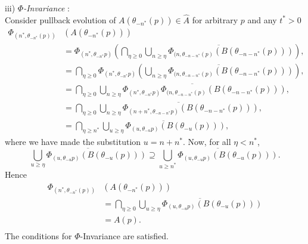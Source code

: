 \begin{prf}
  \hspace*{3mm} iii) {\em $\Phi$-Invariance} : \hfill \\
  Consider pullback evolution of  $A(\theta_{-n^*}(p))
  \in \hat{A}$ for arbitrary $p$ and any $t^* > 0$
    \begin{align*}
  \Phi_{(n^*, \theta_{-n^*}(p))} &(A(\theta_{-n^*}(p))) \\
  &=\Phi_{(n^*, \theta_{-n^*}p)}\left(\bigcap_{\eta \geq 0}
       \overline{ \bigcup_{n
       \geq \eta} \Phi_{(n, \theta_{-n - n^*}(p)} (B(\theta_{-n -
       n^*}(p)))}\right), \\
  &= \bigcap_{\eta \geq 0} \Phi_{(n^*, \theta_{-n^*}p)}\left(
     \overline{\bigcup_{n \geq \eta} \Phi_{(n, \theta_{-n - n^*}(p)}
     (B(\theta_{-n - n^*}(p)))}\right), \\
  &= \bigcap_{\eta \geq 0} \overline{\bigcup_{n \geq \eta} \Phi_{(n^*,
     \theta_{-n^*}p)} \Phi_{(n, \theta_{-n - n^*}(p)} (B(\theta_{-n -
     n^*}(p)))}, \\
  &= \bigcap_{\eta \geq 0} \overline{\bigcup_{n \geq \eta} \Phi_{(n+n^*,
     \theta_{-n-n^*}p)} (B(\theta_{-n - n^*}(p)))}, \\
  &= \bigcap_{\eta \geq n^*} \overline{\bigcup_{u \geq \eta} \Phi_{(u,
     \theta_{-u}p)} (B(\theta_{-u}(p)))},
  \end{align*}
  where we have made the substitution $u = n + n^*$. Now, for all $\eta <
  n^*$,
  \[ \overline{\bigcup_{u \geq \eta} \Phi_{(u, \theta_{-u}p)}
     (B(\theta_{-u}(p)))} \supseteq \overline{\bigcup_{u \geq n^*} \Phi_{(u,
     \theta_{-u}p)} (B(\theta_{-u}(p)))}. \]
  Hence
  \begin{align*}
  \Phi_{(n^*, \theta_{-n^*}(p))} &(A(\theta_{-n^*}(p))) \\
  &= \bigcap_{\eta \geq 0} \overline{\bigcup_{u \geq \eta} \Phi_{(u,
     \theta_{-u}p)} (B(\theta_{-u}(p)))} \\
  &= A(p). \\
  \end{align*}
  The conditions for $\Phi$-Invariance are satisfied.
\end{prf}

\endinput
